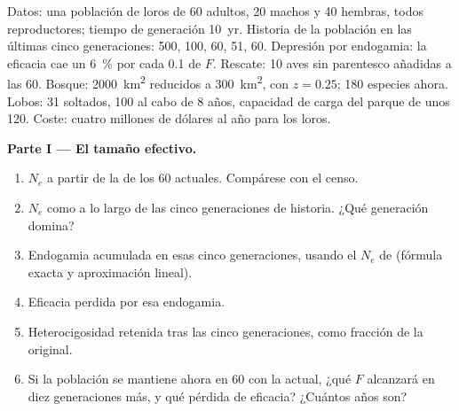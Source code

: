 \begin{problem}
\label{pb:b3:conservation-biology:1}
Datos: una población de loros de 60 adultos, 20 machos y 40 hembras,
todos reproductores; tiempo de generación \qty{10}{yr}. Historia de la
población en las últimas cinco generaciones: 500, 100, 60, 51, 60.
Depresión por endogamia: la eficacia cae un \qty{6}{\%} por cada
\qty{0.1}{} de $F$. Rescate: 10 aves sin parentesco añadidas a las 60.
Bosque: \qty{2000}{km^2} reducidos a \qty{300}{km^2}, con $z = 0.25$;
180 especies ahora. Lobos: 31 soltados, 100 al cabo de 8 años,
capacidad de carga del parque de unos 120. Coste: cuatro millones de
dólares al año para los loros.

\medskip
\noindent\textbf{Parte I --- El tamaño efectivo.}
\begin{enumerate}
  \item $N_{e}$ a partir de la  de los 60 actuales.
        Compárese con el censo.
  \item $N_{e}$ como  a lo largo de las cinco generaciones
        de historia. ¿Qué generación domina?
  \item Endogamia acumulada en esas cinco generaciones, usando el
        $N_{e}$ de  (fórmula exacta y aproximación
        lineal).
  \item Eficacia perdida por esa endogamia.
  \item Heterocigosidad retenida tras las cinco generaciones, como
        fracción de la original.
  \item Si la población se mantiene ahora en 60 con la  actual, ¿qué $F$ alcanzará en diez generaciones más, y qué
        pérdida de eficacia? ¿Cuántos años son?
\end{enumerate}


\end{problem}
